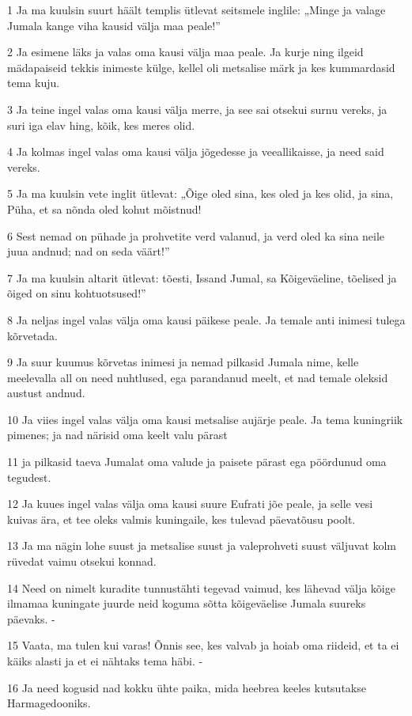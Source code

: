 \par 1 Ja ma kuulsin suurt häält templis ütlevat seitsmele inglile: „Minge ja valage Jumala kange viha kausid välja maa peale!”
\par 2 Ja esimene läks ja valas oma kausi välja maa peale. Ja kurje ning ilgeid mädapaiseid tekkis inimeste külge, kellel oli metsalise märk ja kes kummardasid tema kuju.
\par 3 Ja teine ingel valas oma kausi välja merre, ja see sai otsekui surnu vereks, ja suri iga elav hing, kõik, kes meres olid.
\par 4 Ja kolmas ingel valas oma kausi välja jõgedesse ja veeallikaisse, ja need said vereks.
\par 5 Ja ma kuulsin vete inglit ütlevat: „Õige oled sina, kes oled ja kes olid, ja sina, Püha, et sa nõnda oled kohut mõistnud!
\par 6 Sest nemad on pühade ja prohvetite verd valanud, ja verd oled ka sina neile juua andnud; nad on seda väärt!”
\par 7 Ja ma kuulsin altarit ütlevat: tõesti, Issand Jumal, sa Kõigeväeline, tõelised ja õiged on sinu kohtuotsused!”
\par 8 Ja neljas ingel valas välja oma kausi päikese peale. Ja temale anti inimesi tulega kõrvetada.
\par 9 Ja suur kuumus kõrvetas inimesi ja nemad pilkasid Jumala nime, kelle meelevalla all on need nuhtlused, ega parandanud meelt, et nad temale oleksid austust andnud.
\par 10 Ja viies ingel valas välja oma kausi metsalise aujärje peale. Ja tema kuningriik pimenes; ja nad närisid oma keelt valu pärast
\par 11 ja pilkasid taeva Jumalat oma valude ja paisete pärast ega pöördunud oma tegudest.
\par 12 Ja kuues ingel valas välja oma kausi suure Eufrati jõe peale, ja selle vesi kuivas ära, et tee oleks valmis kuningaile, kes tulevad päevatõusu poolt.
\par 13 Ja ma nägin lohe suust ja metsalise suust ja valeprohveti suust väljuvat kolm rüvedat vaimu otsekui konnad.
\par 14 Need on nimelt kuradite tunnustähti tegevad vaimud, kes lähevad välja kõige ilmamaa kuningate juurde neid koguma sõtta kõigeväelise Jumala suureks päevaks. -
\par 15 Vaata, ma tulen kui varas! Õnnis see, kes valvab ja hoiab oma riideid, et ta ei käiks alasti ja et ei nähtaks tema häbi. -
\par 16 Ja need kogusid nad kokku ühte paika, mida heebrea keeles kutsutakse Harmagedooniks.
